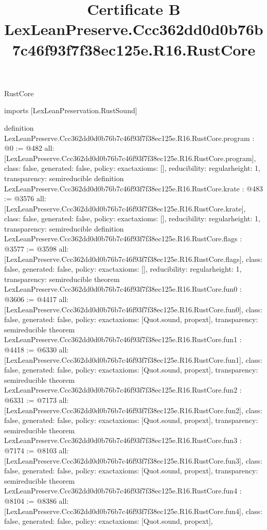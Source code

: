 \begin{lexlean}{RustCore}
\title{Certificate B LexLeanPreserve.Ccc362dd0d0b76b7c46f93f7f38ec125e.R16.RustCore}
\begin{coremodule}
imports [LexLeanPreservation.RustSound]

definition LexLeanPreserve.Ccc362dd0d0b76b7c46f93f7f38ec125e.R16.RustCore.program : @0 := @482 {
  all: [LexLeanPreserve.Ccc362dd0d0b76b7c46f93f7f38ec125e.R16.RustCore.program],
  class: false,
  generated: false,
  policy: exact{axioms: []},
  reducibility: regular{height: 1},
  transparency: semireducible
}
definition LexLeanPreserve.Ccc362dd0d0b76b7c46f93f7f38ec125e.R16.RustCore.krate : @483 := @3576 {
  all: [LexLeanPreserve.Ccc362dd0d0b76b7c46f93f7f38ec125e.R16.RustCore.krate],
  class: false,
  generated: false,
  policy: exact{axioms: []},
  reducibility: regular{height: 1},
  transparency: semireducible
}
definition LexLeanPreserve.Ccc362dd0d0b76b7c46f93f7f38ec125e.R16.RustCore.flags : @3577 := @3598 {
  all: [LexLeanPreserve.Ccc362dd0d0b76b7c46f93f7f38ec125e.R16.RustCore.flags],
  class: false,
  generated: false,
  policy: exact{axioms: []},
  reducibility: regular{height: 1},
  transparency: semireducible
}
theorem LexLeanPreserve.Ccc362dd0d0b76b7c46f93f7f38ec125e.R16.RustCore.fun0 : @3606 := @4417 {
  all: [LexLeanPreserve.Ccc362dd0d0b76b7c46f93f7f38ec125e.R16.RustCore.fun0],
  class: false,
  generated: false,
  policy: exact{axioms: [Quot.sound, propext]},
  transparency: semireducible
}
theorem LexLeanPreserve.Ccc362dd0d0b76b7c46f93f7f38ec125e.R16.RustCore.fun1 : @4418 := @6330 {
  all: [LexLeanPreserve.Ccc362dd0d0b76b7c46f93f7f38ec125e.R16.RustCore.fun1],
  class: false,
  generated: false,
  policy: exact{axioms: [Quot.sound, propext]},
  transparency: semireducible
}
theorem LexLeanPreserve.Ccc362dd0d0b76b7c46f93f7f38ec125e.R16.RustCore.fun2 : @6331 := @7173 {
  all: [LexLeanPreserve.Ccc362dd0d0b76b7c46f93f7f38ec125e.R16.RustCore.fun2],
  class: false,
  generated: false,
  policy: exact{axioms: [Quot.sound, propext]},
  transparency: semireducible
}
theorem LexLeanPreserve.Ccc362dd0d0b76b7c46f93f7f38ec125e.R16.RustCore.fun3 : @7174 := @8103 {
  all: [LexLeanPreserve.Ccc362dd0d0b76b7c46f93f7f38ec125e.R16.RustCore.fun3],
  class: false,
  generated: false,
  policy: exact{axioms: [Quot.sound, propext]},
  transparency: semireducible
}
theorem LexLeanPreserve.Ccc362dd0d0b76b7c46f93f7f38ec125e.R16.RustCore.fun4 : @8104 := @8386 {
  all: [LexLeanPreserve.Ccc362dd0d0b76b7c46f93f7f38ec125e.R16.RustCore.fun4],
  class: false,
  generated: false,
  policy: exact{axioms: [Quot.sound, propext]},
}
\end{coremodule}
\end{lexlean}
